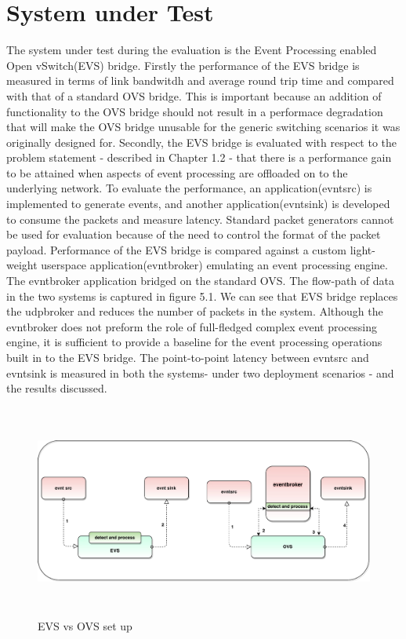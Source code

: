 \section{System under Test}
The system under test during the evaluation is the Event Processing enabled Open vSwitch(EVS) bridge. Firstly the performance of the EVS bridge is measured in terms of link bandwitdh and average round trip time and compared with that of a standard OVS bridge. This is important because an addition of functionality to the OVS bridge should not result in a performace degradation that will make the OVS bridge unusable for the generic switching scenarios it was originally designed for. 
\newline
Secondly, the EVS bridge is evaluated with respect to the problem statement - described in Chapter 1.2 - that there is a performance gain to be attained when aspects of event processing are offloaded on to the underlying network. To evaluate the performance, an  application(evntsrc) is implemented to generate events, and another application(evntsink) is developed to consume the packets and measure latency. Standard packet generators cannot be used for evaluation because of the need to control the format of the packet payload. Performance of the EVS bridge is compared against a custom light-weight userspace application(evntbroker) emulating an event processing engine. The evntbroker application bridged on the standard OVS. The flow-path of data in the two systems is captured in figure 5.1. We can see that EVS bridge replaces the udpbroker and reduces the number of packets in the system. Although the evntbroker does not preform the role of full-fledged complex event processing engine, it is sufficient to provide a baseline for the event processing operations built in to the EVS bridge. The point-to-point latency between evntsrc and evntsink is measured in both the systems- under two deployment scenarios - and the results discussed.

 \begin{figure}[H]
    
	\caption{EVS vs OVS set up}
		\includegraphics[height=7cm]{evsovs.pdf}
\end{figure}



